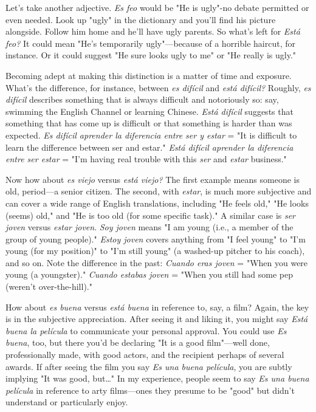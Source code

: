 \documentclass[14pt,a4paper,oneside]{memoir}
\begin{document}
Let's take another adjective. \emph{Es feo} would be "He is ugly"-no
debate permitted or even needed. Look up "ugly" in the dictionary and
you'll find his picture alongside. Follow him home and he'll have ugly
parents. So what's left for \emph{Está feo?} It could mean "He's temporarily
ugly"---because of a horrible haircut, for instance. Or it could suggest
"He sure looks ugly to me" or "He really is ugly."

Becoming adept at making this distinction is a matter of time
and exposure. What's the difference, for instance, between \emph{es difícil}
and \emph{está difícil?} Roughly, \emph{es difícil} describes something that is always
difficult and notoriously so: say, swimming the English Channel or
learning Chinese. \emph{Está difícil} suggests that something that has come
up is difficult or that something is harder than was expected. \emph{Es difícil aprender la diferencia entre ser y estar}
= "It is difficult to learn the
difference between ser and estar." \emph{Está difícil aprender la diferencia
	entre ser estar} = "I'm having real trouble with this \emph{ser} and \emph{estar}
business."

Now how about \emph{es viejo} versus \emph{está viejo?} The first example
means someone is old, period---a senior citizen. The second, with
\emph{estar}, is much more subjective and can cover a wide range of English
translations, including "He feels old," "He looks (seems) old," and
"He is too old (for some specific task)." A similar case is \emph{ser joven}
versus \emph{estar joven}. \emph{Soy joven} means "I am young (i.e., a member
of the group of young people)." \emph{Estoy joven} covers anything from "I
feel young" to "I'm young (for my position)" to "I'm still young" (a
washed-up pitcher to his coach), and so on. Note the difference in the
past: \emph{Cuando eras joven} = "When you were young (a youngster)."
\emph{Cuando estabas joven} = "When you still had some pep (weren't over-the-hill)."

How about \emph{es buena} versus \emph{está buena} in reference to, say, a
film? Again, the key is in the subjective appreciation. After seeing it
and liking it, you might say \emph{Está buena la película} to communicate
your personal approval. You could use \emph{Es buena}, too, but there you'd
be declaring "It is a good film"---well done, professionally made, with
good actors, and the recipient perhaps of several awards. If after seeing
the film you say \emph{Es una buena película}, you are subtly implying "It
was good, but\ldots{}" In my experience, people seem to say \emph{Es una
	buena película} in reference to arty films---ones they presume to be
"good" but didn't understand or particularly enjoy.
\end{document}
